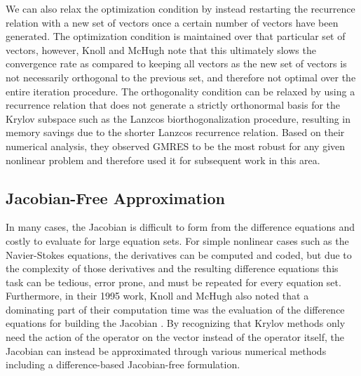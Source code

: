 We can also relax the optimization condition by instead restarting the
recurrence relation with a new set of vectors once a certain number of
vectors have been generated. The optimization condition is maintained
over that particular set of vectors, however, Knoll and McHugh note
that this ultimately slows the convergence rate as compared to keeping
all vectors as the new set of vectors is not necessarily orthogonal to
the previous set, and therefore not optimal over the entire iteration
procedure. The orthogonality condition can be relaxed by using a
recurrence relation that does not generate a strictly orthonormal
basis for the Krylov subspace such as the Lanzcos biorthogonalization
procedure, resulting in memory savings due to the shorter Lanzcos
recurrence relation. Based on their numerical analysis, they observed
GMRES to be the most robust for any given nonlinear problem and
therefore used it for subsequent work in this area.

\subsection{Jacobian-Free Approximation}
\label{subsec:jacobian_free_approximation}
In many cases, the Jacobian is difficult to form from the difference
equations and costly to evaluate for large equation sets. For simple
nonlinear cases such as the Navier-Stokes equations, the derivatives
can be computed and coded, but due to the complexity of those
derivatives and the resulting difference equations this task can be
tedious, error prone, and must be repeated for every equation
set. Furthermore, in their 1995 work, Knoll and McHugh also noted that
a dominating part of their computation time was the evaluation of the
difference equations for building the Jacobian
\citep{knoll_newton-krylov_1995}. By recognizing that Krylov methods
only need the action of the operator on the vector instead of the
operator itself, the Jacobian can instead be approximated through
various numerical methods including a difference-based Jacobian-free
formulation. 

